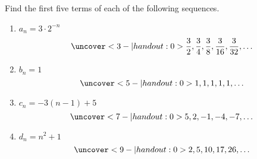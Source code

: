 \begin{frame}
\begin{example}
Find the first five terms of each of the following sequences.  
\begin{enumerate}
\item<alert@2-3| handout:alert@0>  $a_n = 3\cdot 2^{-n}$
\[
\uncover<3-| handout:0>{%
\frac{3}{2},\frac{3}{4},\frac{3}{8},\frac{3}{16},\frac{3}{32},\ldots
}%
\]
\item<alert@4-5| handout:alert@0>  $b_n = 1$
\[
\uncover<5-| handout:0>{%
1,1,1,1,1,\ldots
}%
\]
\item<alert@6-7| handout:alert@0>  $c_n = -3(n-1)+5$
\[
\uncover<7-| handout:0>{%
5,2,-1,-4,-7,\ldots
}%
\]
\item<alert@8-9| handout:alert@0>  $d_n = n^2+1$
\[
\uncover<9-| handout:0>{%
2,5,10,17,26,\ldots
}%
\]
\end{enumerate}
\end{example}

\end{frame}
